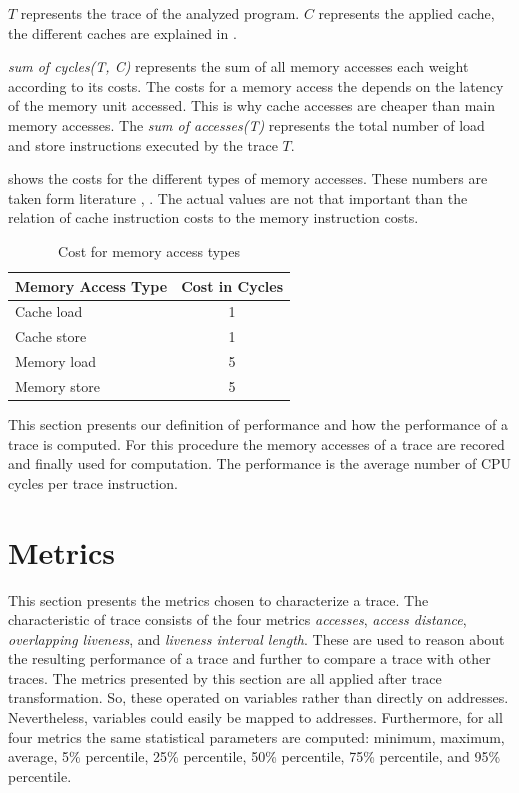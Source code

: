 \documentclass[onecolumn, openright, master, english, signatures]{dbrgrptt}
\begin{document}
$T$ represents the \ac{trace} of the analyzed program. $C$ represents the applied cache, the different caches are explained in .

\emph{sum of cycles(T, C)} represents the sum of all memory accesses each weight according to its costs. The costs for a memory access the depends on the latency of the memory unit accessed. This is why cache accesses are cheaper than main memory accesses. The \emph{sum of accesses(T)} represents the total number of load and store instructions executed by the \ac{trace} $T$.

 shows the costs for the different types of memory accesses. These numbers are taken form literature \cite{drepper2007every}, \cite{skylake}. The actual values are not that important than the relation of cache instruction costs to the memory instruction costs.

\begin{table}[!ht]
  \centering
  \begin{tabular}{lc}
  \hline
  Memory Access Type & Cost in Cycles \\
  \hline
  Cache  load  & 1 \\
  Cache  store & 1 \\
  Memory load  & 5 \\
  Memory store & 5 \\
  \hline
  \end{tabular}
  \caption{Cost for memory access types}
  \label{tab:memory-access-cost}
\end{table}

This section presents our definition of performance and how the performance of a trace is computed. For this procedure the memory accesses of a  \ac{trace} are recored and finally used for computation. The performance is the average number of \ac{CPU} cycles per \ac{trace} instruction.


\section{Metrics}\label{sec:metrics}

This section presents the metrics chosen to characterize a \ac{trace}. The characteristic of \ac{trace} consists of the four metrics \emph{accesses}, \emph{access distance}, \emph{overlapping liveness}, and \emph{liveness interval length}. These are used to reason about the resulting performance of a \ac{trace} and further to compare a \ac{trace} with other \ac{trace}s. The metrics presented by this section are all applied after \ac{trace} transformation. So, these operated on variables rather than directly on addresses. Nevertheless, variables could easily be mapped to addresses. Furthermore, for all four metrics the same statistical parameters are computed: minimum, maximum, average, 5\% percentile, 25\% percentile, 50\% percentile, 75\% percentile, and 95\% percentile.
\end{document}
